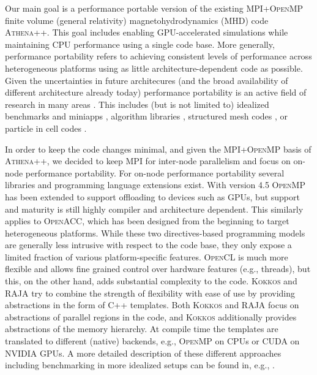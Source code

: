 \documentclass[10pt,journal,compsoc]{IEEEtran}
\newcommand{\textcode}[1]{\textsc{#1}}
\newcommand{\kokkos}{\textcode{Kokkos}\xspace}
\newcommand{\athena}{\textcode{Athena++}\xspace}
\newcommand{\cuda}{\textcode{CUDA}\xspace}
\newcommand{\openmp}{\textcode{OpenMP}\xspace}
\newcommand{\opencl}{\textcode{OpenCL}\xspace}
\newcommand{\openacc}{\textcode{OpenACC}\xspace}
\newcommand{\mpi}{\textcode{MPI}\xspace}
\newcommand{\mpiopenmp}{\textcode{MPI+OpenMP}\xspace}
\newcommand{\raja}{\textcode{RAJA}\xspace}
\newcommand{\cpp}{\textcode{C++}\xspace}
\begin{document}
Our main goal is a performance portable version of the existing \mpiopenmp 
finite volume (general relativity)
magnetohydrodynamics (MHD) code \athena \cite{White2016,Stone2019}. 
This goal includes enabling GPU-accelerated simulations while
maintaining CPU performance using a single code base.
More generally, performance portability refers to achieving consistent levels
of performance across heterogeneous platforms using as little architecture-dependent
code as possible.
Given the uncertainties in future architecures (and the broad availability of different
architecture already today) performance portability is an active field of research
in many areas \cite{perfportbook,Bennett2015}.
This includes (but is not limited to) idealized benchmarks and miniapps 
\cite{Heroux2009, Martineau2017, Deakin2018, Hammond2019},
algorithm libraries \cite{Heroux2012},
structured mesh codes \cite{Holmen2019}, or particle in cell codes \cite{Artigues2019}.

In order to keep the code changes minimal, and given the \mpiopenmp basis of \athena, we
decided to keep \mpi for inter-node parallelism and focus on on-node performance
portability.
For on-node performance portability several libraries and programming language extensions
exist.
With version 4.5 \openmp \cite{openmp} has been extended to support offloading to devices
such as GPUs, but support and maturity is still highly compiler and 
architecture dependent.
This similarly applies to \openacc, which
has been designed from the beginning to target heterogeneous platforms.
While these two directives-based programming models are generally less intrusive 
with respect to the code base, they only expose a limited fraction of various platform-specific features.
\opencl \cite{opencl} is much more flexible and allows fine grained control over
hardware features (e.g., threads), but this, on the other hand, 
adds substantial complexity to the code.
\kokkos \cite{Edwards2014} and \raja \cite{raja} try to combine the strength of 
flexibility with ease of use by providing abstractions in the form of \cpp templates.
Both \kokkos and \raja focus on abstractions of parallel regions in the code, and
\kokkos additionally provides abstractions of the memory hierarchy.
At compile time the templates are translated to different (native) backends, e.g., 
\openmp on CPUs or \cuda on NVIDIA GPUs.
A more detailed description of these different approaches including benchmarking
in more idealized setups can be found in, e.g., \cite{Martineau2017,Deakin2018}.
\end{document}
